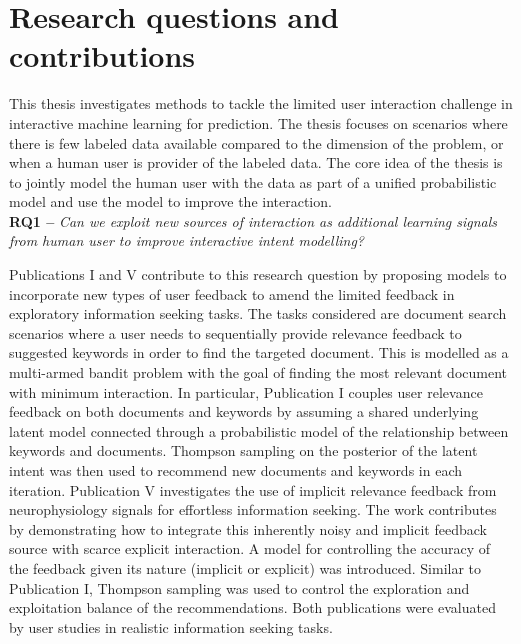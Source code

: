 \documentclass[dissertation,math,vertlayout,pdfa,colorlinks]{aaltoseries}
\begin{document}





 
\section{Research questions and contributions}


This thesis investigates methods to tackle the limited user interaction challenge in interactive machine learning for prediction. The thesis focuses on scenarios where there is few labeled data available compared to the dimension of the problem, or when a human user is provider of the labeled data. The core idea of the thesis is to jointly model the human user with the data as part of a unified probabilistic model and use the model to improve the interaction.\\

\noindent \textbf{RQ1 --} \textit{Can we exploit new sources of interaction as additional learning signals from human user to improve interactive intent modelling?}

Publications I and V contribute to this research question by proposing models to incorporate new types of user feedback to amend the limited feedback in exploratory information seeking tasks. The tasks considered are document search scenarios where a user needs to sequentially provide relevance feedback to suggested keywords in order to find the targeted document. This is modelled as a multi-armed bandit problem with the goal of finding the most relevant document with minimum interaction. In particular, Publication I couples user relevance feedback on both documents and keywords by assuming a shared underlying latent model connected through a probabilistic model of the relationship between keywords and documents. Thompson sampling on the posterior of the latent intent was then used to recommend new documents and keywords in each iteration. Publication V investigates the use of implicit relevance feedback from neurophysiology signals for effortless information seeking. The work contributes by demonstrating how to integrate this inherently noisy and implicit feedback source with scarce explicit interaction. A model for controlling the accuracy of the feedback given its nature (implicit or explicit) was introduced. Similar to Publication I, Thompson sampling was used to control the exploration and exploitation balance of the recommendations. Both publications were evaluated by user studies in realistic information seeking tasks. 
\end{document}
